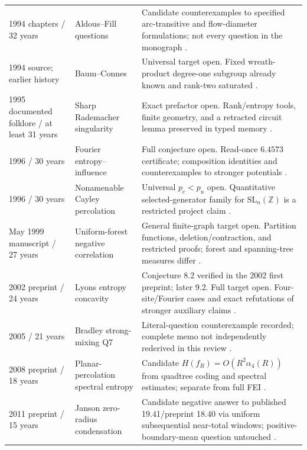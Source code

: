 \begin{longtable}{p{}p{}p{}}
1994 chapters / 32 years & Aldous--Fill questions & Candidate counterexamples to specified arc-transitive and flow-diameter formulations; not every question in the monograph \citep{AldousFillBook,CaseArcTransitive2026,CaseFlowDiameter2026}.\\[0.55em]
1994 source; earlier history & Baum--Connes & Universal target open. Fixed wreath-product degree-one subgroup already known and rank-two saturated \citep{CaseBaumConnes2026}.\\[0.55em]
1995 documented folklore / at least 31 years & Sharp Rademacher singularity & Exact prefactor open. Rank/entropy tools, finite geometry, and a retracted circuit lemma preserved in typed memory \citep{KahnKomlosSzemeredi1995,CaseRademacherMemory2026}.\\[0.55em]
1996 / 30 years & Fourier entropy--influence & Full conjecture open. Read-once $6.4573$ certificate; composition identities and counterexamples to stronger potentials \citep{ODonnellTanFEI,CaseFEIReadOnce2026}.\\[0.55em]
1996 / 30 years & Nonamenable Cayley percolation & Universal $p_c<p_u$ open. Quantitative selected-generator family for $\mathrm{SL}_n(\mathbb Z)$ is a restricted project claim \citep{BenjaminiSchramm1996,CaseProgress2026}.\\[0.55em]
May 1999 manuscript / 27 years & Uniform-forest negative correlation & General finite-graph target open. Partition functions, deletion/contraction, and restricted proofs; forest and spanning-tree measures differ \citep{PemantleNegativeDependence,GrimmettWinklerForests,CaseProgress2026}.\\[0.55em]
2002 preprint / 24 years & Lyons entropy concavity & Conjecture 8.2 verified in the 2002 first preprint; later 9.2. Full target open. Four-site/Fourier cases and exact refutations of stronger auxiliary claims \citep{Lyons2002Preprint,Lyons2003,CaseLyons2026}.\\[0.55em]
2005 / 21 years & Bradley strong-mixing Q7 & Literal-question counterexample recorded; complete memo not independently rederived in this review \citep{Bradley2005,CaseCampaignIndex2026}.\\[0.55em]
2008 preprint / 18 years & Planar-percolation spectral entropy & Candidate $H(f_R)=O(R^2\alpha_4(R))$ from quadtree coding and spectral estimates; separate from full FEI \citep{GarbanPeteSchramm2010,CaseCampaignIndex2026}.\\[0.55em]
2011 preprint / 15 years & Janson zero-radius condensation & Candidate negative answer to published 19.41/preprint 18.40 via uniform subsequential near-total windows; positive-boundary-mean question untouched \citep{Janson2012,CaseJanson2026}.\\[0.55em]

\end{longtable}
